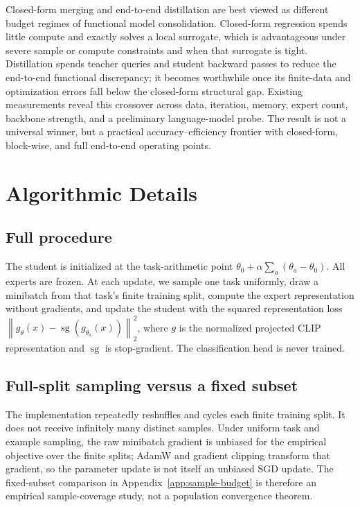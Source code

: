 \documentclass[letterpaper]{article} %
\newcommand{\norm}[1]{\left\lVert #1\right\rVert}
\theoremstyle{plain}
\theoremstyle{definition}
\begin{document}
Closed-form merging and end-to-end distillation are best viewed as different budget regimes of functional model consolidation.
Closed-form regression spends little compute and exactly solves a local surrogate, which is advantageous under severe sample or compute constraints and when that surrogate is tight.
Distillation spends teacher queries and student backward passes to reduce the end-to-end functional discrepancy; it becomes worthwhile once its finite-data and optimization errors fall below the closed-form structural gap.
Existing measurements reveal this crossover across data, iteration, memory, expert count, backbone strength, and a preliminary language-model probe.
The result is not a universal winner, but a practical accuracy--efficiency frontier with closed-form, block-wise, and full end-to-end operating points.



\appendix
\section{Algorithmic Details}
\label{app:algorithm}

\subsection{Full procedure}
The student is initialized at the task-arithmetic point $\theta_0+\alpha\sum_a(\theta_a-\theta_0)$.
All experts are frozen.
At each update, we sample one task uniformly, draw a minibatch from that task's finite training split, compute the expert representation without gradients, and update the student with the squared representation loss $\norm{g_\theta(x)-\operatorname{sg}(g_{\theta_a}(x))}_2^2$, where $g$ is the normalized projected CLIP representation and $\operatorname{sg}$ is stop-gradient.
The classification head is never trained.

\subsection{Full-split sampling versus a fixed subset}
The implementation repeatedly reshuffles and cycles each finite training split.
It does not receive infinitely many distinct samples.
Under uniform task and example sampling, the raw minibatch gradient is unbiased for the empirical objective over the finite splits; AdamW and gradient clipping transform that gradient, so the parameter update is not itself an unbiased SGD update.
The fixed-subset comparison in Appendix~\ref{app:sample-budget} is therefore an empirical sample-coverage study, not a population convergence theorem.
\end{document}

